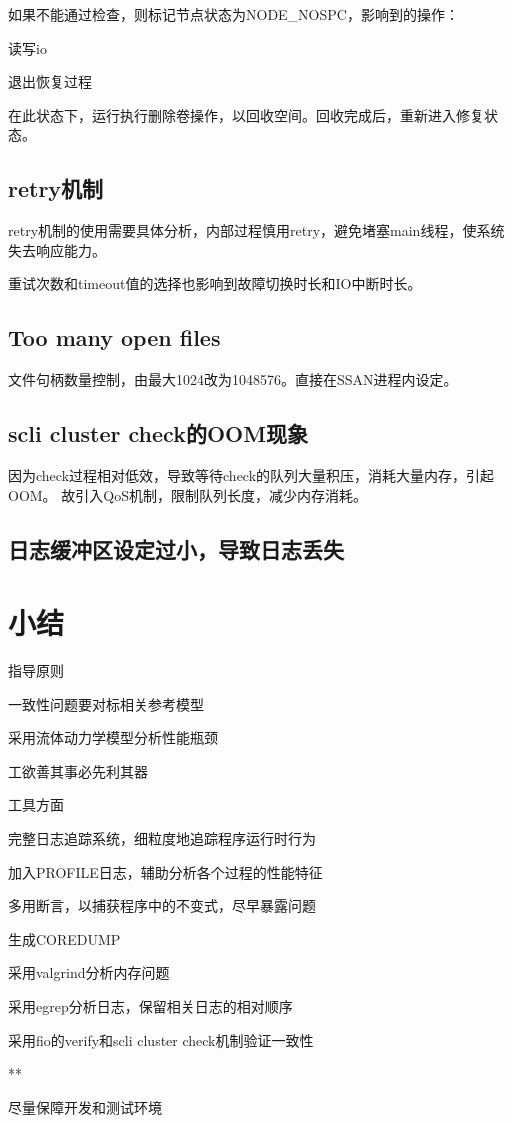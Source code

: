 如果不能通过检查，则标记节点状态为NODE\_NOSPC，影响到的操作：
\begin{enumbox}
\item 读写io
\item 退出恢复过程
\end{enumbox}

在此状态下，运行执行删除卷操作，以回收空间。回收完成后，重新进入修复状态。

\subsection{retry机制}

retry机制的使用需要具体分析，内部过程慎用retry，避免堵塞main线程，使系统失去响应能力。

重试次数和timeout值的选择也影响到故障切换时长和IO中断时长。

\subsection{Too many open files}

文件句柄数量控制，由最大1024改为1048576。直接在SSAN进程内设定。

\subsection{scli cluster check的OOM现象}

因为check过程相对低效，导致等待check的队列大量积压，消耗大量内存，引起OOM。
故引入QoS机制，限制队列长度，减少内存消耗。

\subsection{日志缓冲区设定过小，导致日志丢失}

\section{小结}

指导原则
\begin{enumbox}
\item 一致性问题要对标相关参考模型
\item 采用流体动力学模型分析性能瓶颈
\item 工欲善其事必先利其器
\end{enumbox}

工具方面
\begin{enumbox}
\item 完整日志追踪系统，细粒度地追踪程序运行时行为
\item 加入PROFILE日志，辅助分析各个过程的性能特征
\item 多用断言，以捕获程序中的不变式，尽早暴露问题
\item 生成COREDUMP
\item 采用valgrind分析内存问题
\item 采用egrep分析日志，保留相关日志的相对顺序
\item 采用fio的verify和scli cluster check机制验证一致性
\item ***
\item 尽量保障开发和测试环境
\end{enumbox}

